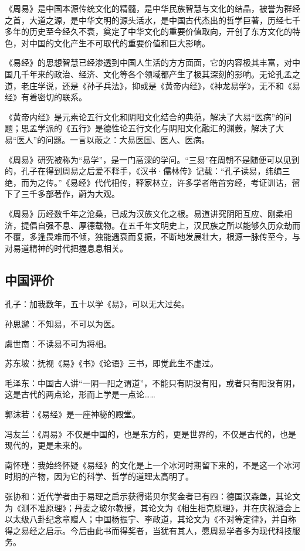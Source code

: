 \documentclass[a4paper,12pt,UTF8,twoside]{ctexbook}
\begin{document}
《周易》是中国本源传统文化的精髓，是中华民族智慧与文化的结晶，被誉为群经之首，大道之源，是中华文明的源头活水，是中国古代杰出的哲学巨著，历经七千多年的历史至今经久不衰，奠定了中华文化的重要价值取向，开创了东方文化的特色，对中国的文化产生不可取代的重要价值和巨大影响。

《易经》的思想智慧已经渗透到中国人生活的方方面面，它的内容极其丰富，对中国几千年来的政治、经济、文化等各个领域都产生了极其深刻的影响。无论孔孟之道，老庄学说，还是《孙子兵法》，抑或是《黄帝内经》，《神龙易学》，无不和《易经》有着密切的联系。

《黄帝内经》是元素论五行文化和阴阳文化结合的典范，解决了大易“医病”的问题；思孟学派的《五行》是德性论五行文化与阴阳文化融汇的渊薮，解决了大易“医人”的问题。一言以蔽之：大易医国、医人、医病。

《周易》研究被称为“易学”，是一门高深的学问。“三易”在周朝不是随便可以见到的，孔子在得到周易之后爱不释手，《汉书·儒林传》记载：“孔子读易，纬编三绝，而为之传。”《易经》代代相传，释家林立，许多学者皓首穷经，考证训诂，留下了三千多部著作，蔚为大观。

《周易》历经数千年之沧桑，已成为汉族文化之根。易道讲究阴阳互应、刚柔相济，提倡自强不息、厚德载物。在五千年文明史上，汉民族之所以能够久历众劫而不覆，多逢畏难而不倾，独能遇衰而复振，不断地发展壮大，根源一脉传至今，与对易道精神的时代把握息息相关。

\subsection{中国评价}
孔子：加我数年，五十以学《易》，可以无大过矣。

孙思邈：不知易，不可以为医。

虞世南：不读易不可为将相。

苏东坡：抚视《易》《书》《论语》三书，即觉此生不虚过。

毛泽东：中国古人讲“一阴一阳之谓道”，不能只有阴没有阳，或者只有阳没有阴，这是古代的两点论，形而上学是一点论……

郭沫若：《易经》是一座神秘的殿堂。

冯友兰：《周易》不仅是中国的，也是东方的，更是世界的，不仅是古代的，也是现代的，更是未来的。

南怀瑾：我始终怀疑《易经》的文化是上一个冰河时期留下来的，不是这一个冰河时期的产物，因为它的科学、哲学的道理太高明了。

张协和：近代学者由于易理之启示获得诺贝尔奖金者已有四：德国汉森堡，其论文为《测不准原理》；丹麦之玻尔教授，其论文为《相生相克原理》，并在庆祝酒会上以太级八卦纪念章赠人；中国杨振宁、李政道，其论文为《不对等定律》，并自称得之易经之启示。今后由此书而得奖者，当犹有其人，愿周易学者多为现代科技服务。
\end{document}
